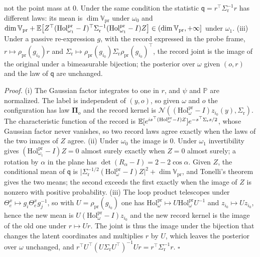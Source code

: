 not the point mass at $0$. Under the same condition the statistic $\mathsf q=r^\top\Sigma_{\mathrm r}^{-1}r$
has different laws: its mean is $\dim \mathbb V_{\mathrm{pr}}$ under $\omega_0$ and
$\dim \mathbb V_{\mathrm{pr}}+\mathbb E\bigl[Z^\top(\mathrm{Hol}^{\mathrm{pr}}_{\omega_1}-I)^\top\Sigma_{\mathrm r}^{-1}
(\mathrm{Hol}^{\mathrm{pr}}_{\omega_1}-I)Z\bigr]\in(\dim \mathbb V_{\mathrm{pr}},+\infty]$ under $\omega_1$. (iii)
Under a passive re-expression $g$, with the record expressed in the probe frame,
$r\mapsto\rho_{\mathrm{pr}}(g_{i_0})r$ and
$\Sigma_{\mathrm r}\mapsto\rho_{\mathrm{pr}}(g_{i_0})\Sigma_{\mathrm r}\rho_{\mathrm{pr}}(g_{i_0})^\top$, the
record joint is the image of the original under a bimeasurable bijection; the posterior over $\omega$ given
$(o,r)$ and the law of $\mathsf q$ are unchanged. 

\noindent\emph{Proof.}
(i) The Gaussian factor integrates to one in $r$, and $\psi$ and $\mathbb P$ are normalized. The label is
independent of $(y,o)$, so given $\omega$ and $o$ the configuration has law $\boldsymbol\Pi_o$ and the
record kernel is $\mathcal N((\mathrm{Hol}^{\mathrm{pr}}_\omega-I)z_{i_0}(y),\Sigma_{\mathrm r})$. The
characteristic function of the record is
$\mathbb E[e^{is^\top(\mathrm{Hol}^{\mathrm{pr}}_\omega-I)Z}]e^{-s^\top\Sigma_{\mathrm r}s/2}$, whose Gaussian factor
never vanishes, so two record laws agree exactly when the laws of the two images of $Z$ agree. (ii) Under
$\omega_0$ the image is $0$. Under $\omega_1$ invertibility gives
$(\mathrm{Hol}^{\mathrm{pr}}_{\omega_1}-I)Z=0$ almost surely exactly when $Z=0$ almost surely; a rotation by
$\alpha$ in the plane has $\det(R_\alpha-I)=2-2\cos\alpha$. Given $Z$, the conditional mean of $\mathsf q$ is
$\lvert\Sigma_{\mathrm r}^{-1/2}(\mathrm{Hol}^{\mathrm{pr}}_\omega-I)Z\rvert^2+\dim \mathbb V_{\mathrm{pr}}$, and
Tonelli's theorem gives the two means; the second exceeds the first exactly when the image of $Z$ is
nonzero with positive probability. (iii) The loop product telescopes under
$\Theta^x_e\mapsto g_i\Theta^x_eg_j^{-1}$, so with $U=\rho_{\mathrm{pr}}(g_{i_0})$ one has
$\mathrm{Hol}^{\mathrm{pr}}_\omega\mapsto U\mathrm{Hol}^{\mathrm{pr}}_\omega U^{-1}$ and
$z_{i_0}\mapsto Uz_{i_0}$, hence the new mean is $U(\mathrm{Hol}^{\mathrm{pr}}_\omega-I)z_{i_0}$ and the new
record kernel is the image of the old one under $r\mapsto Ur$. The joint is thus the image under the
bijection that changes the latent coordinates and multiplies $r$ by $U$, which leaves the posterior over
$\omega$ unchanged, and $r^\top U^\top(U\Sigma_{\mathrm r}U^\top)^{-1}Ur=r^\top\Sigma_{\mathrm r}^{-1}r$.
$\square$

